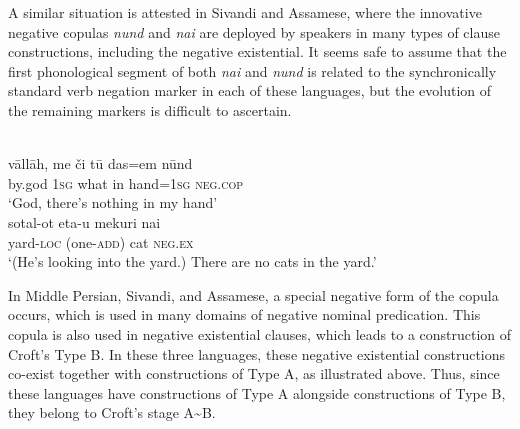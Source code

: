 \documentclass[output=paper]{langsci/langscibook}
\begin{document}
A similar situation is attested in Sivandi and Assamese, where the innovative negative copulas \textit{nund} and \textit{nai} are deployed by speakers in many types of clause constructions, including the negative existential. It seems safe to assume that the first phonological segment of both \textit{nai} and \textit{nund} is related to the synchronically standard verb negation marker in each of these languages, but the evolution of the remaining markers is difficult to ascertain. 
%
\begin{exe}\ex\label{ex:ieur-sivandi-nothing-in-hand}
\\
    \gll vāllāh, me    či      tū  das=em      nūnd \\
by.god  \textsc{1sg}  what  in  hand=\textsc{1sg}  \textsc{neg.cop} \\
    \glt `God, there's nothing in my hand'
\ex\label{ex:ieur-assamese-nocats}
\\
    \gll sotal-ot    {\op}eta-u{\cp}      mekuri nai \\
yard-\textsc{loc} (one-\textsc{add}) cat \textsc{neg.ex} \\
    \glt `(He's looking into the yard.) There are no cats in the yard.'
    \end{exe}

In Middle Persian, Sivandi, and
Assamese, a special negative form of the copula occurs, which is used in many domains of negative nominal predication. This copula is also used in negative existential clauses, which leads to a construction of Croft's Type B. In these three languages, these negative existential constructions co-exist together with constructions of Type A, as illustrated above. Thus, since these languages have constructions of Type A alongside constructions of Type B, they belong to Croft's stage A{\textasciitilde}B. 
\end{document}
